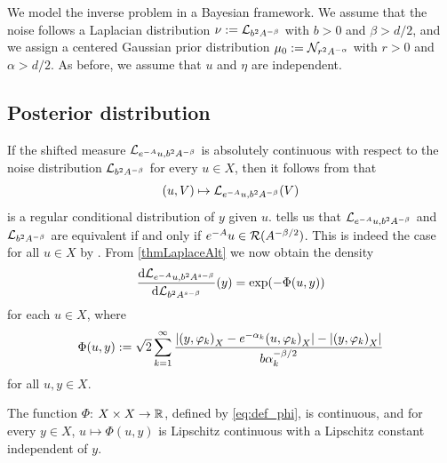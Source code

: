 \documentclass[english]{jnsao}
\theoremstyle{definition}
\begin{document}
We model the inverse problem in a Bayesian framework. We assume that the noise follows a Laplacian distribution $\nu := \mathcal{L}_{b^2A^{-\beta}}$ with $b > 0$ and $\beta > d/2$, and we assign a centered Gaussian prior distribution $\mu_0 := \mathcal{N}_{r^2A^{-\alpha}}$ with $r > 0$ and $\alpha > d/2$. As before, we assume that $u$ and $\eta$ are independent.

\subsection{Posterior distribution}

If the shifted measure $\mathcal{L}_{e^{-A}u, b^2 A^{-\beta}}$ is absolutely continuous with respect to the noise distribution $\mathcal{L}_{b^2 A^{-\beta}}$ for every $u \in X$, then it follows from \cite[Prop.~1.4]{Kretschmann:2019} that
\[ (u,V) \mapsto \mathcal{L}_{e^{-A}u, b^2 A^{-\beta}}(V) \]
is a regular conditional distribution of $y$ given $u$.
 tells us that $\mathcal{L}_{e^{-A}u, b^2 A^{-\beta}}$ and $\mathcal{L}_{b^2 A^{-\beta}}$ are equivalent if and only if $e^{-A}u \in \operatorname{\mathcal{R}}(A^{-\beta/2})$.
This is indeed the case for all $u \in X$ by \cite[Lem.~5.15]{Kretschmann:2019}.
From \cref{thmLaplaceAlt} we now obtain the density
\begin{equation*}
	\frac{\mathrm{d} \mathcal{L}_{e^{-A}u, b^2 A^{s-\beta}}}{\mathrm{d} \mathcal{L}_{b^2 A^{s-\beta}}}(y)
	= \exp(-\Phi(u,y))
\end{equation*}
for each $u \in X$, where
\begin{equation} 
	\label{eq:def_phi}
	\Phi(u,y) := \sqrt{2} \sum_{k=1}^\infty \frac{ \left|{(y,\varphi_k)}_X - e^{-\alpha_k}{(u,\varphi_k)}_X\right| - \left|{(y,\varphi_k)}_X\right|}{b\alpha_k^{-\beta/2}}
\end{equation}
for all $u,y \in X$.

\begin{proposition}
	\label{prop:phi_cont}
	The function $\Phi$: $X \times X \to {\mathbb{R}}$, defined by \eqref{eq:def_phi}, is continuous, and for every $y \in X$, $u \mapsto \Phi(u,y)$ is Lipschitz continuous with a Lipschitz constant independent of $y$.
\end{proposition}
\end{document}

